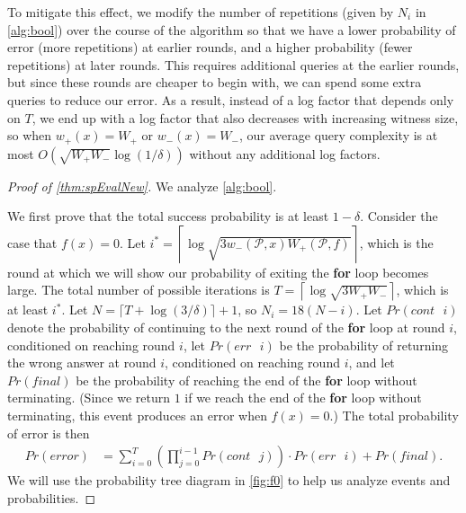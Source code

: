 \documentclass[cleveref, autoref, thm-restate,11pt]{article}
\theoremstyle{definition}
\newcommand{\sop}[1]{{\mathcal #1}}
\newcommand{\wm}[2]{{w_-({#1},{#2})}}
\newcommand{\wpo}[1]{{w_+({#1})}}
\newcommand{\wmo}[1]{{w_-({#1})}}
\newcommand{\PrCont}[1][i]{Pr(cont\textrm{ }#1)} %
\newcommand{\PrErr}[1][i]{Pr(err\textrm{ }#1)} %
\newcommand{\PrFinal}{Pr(final)} %
\newcommand{\PrTerm}[1][i]{Pr(term\textrm{ }#1)} %
\begin{document}
To mitigate this effect, we modify the number of repetitions (given by $N_i$ 
in \cref{alg:bool}) over the course 
of the algorithm so that we have a lower
probability of error (more repetitions) at earlier rounds, and a higher probability (fewer repetitions) at later
rounds. This requires additional queries
at the earlier rounds, but since these rounds are cheaper to begin with, we
can spend some extra queries to reduce our error. As a result, instead of a log factor
that depends only on $T$, we end up with a log factor that also decreases with increasing witness size, so when $\wpo{x} =
W_+$ or $\wmo{x} = W_-$, our average query complexity is at most $O\left(\sqrt
{W_+W_-}\log(1/\delta)\right)$ without any additional log factors.



\begin{proof}[Proof of \cref{thm:spEvalNew}]

We analyze \cref{alg:bool}. 

We first prove that the total success probability is at least $1 - \delta$.
Consider the case that $f(x)=0$. Let 
$i^*=\left\lceil\log\sqrt{3\wm{\sop P}{x}W_+(\sop P,f)}\right\rceil$, which is the round at which we will show our probability of exiting the \textbf{for} loop becomes large. The total number of possible iterations is $T=\left\lceil\log\sqrt{3W_+W_-}\right\rceil$, which is at least $i^*$. Let $N = \lceil T + \log(3/\delta)\rceil + 1$, so $N_i=18(N-i)$. Let $\PrCont$ denote the
probability of continuing to the next round of the \textbf{for} loop at round
$i$, conditioned on reaching round $i$,
let $\PrErr$ be the probability of returning the wrong answer at round $i$, conditioned on reaching round $i$,
and let $\PrFinal$ be the probability of reaching the end of the 
\textbf{for} loop without terminating. (Since we return $1$ if we reach the  end of
the \textbf{for} loop without terminating, this event produces an error when
$f(x)=0$.) The total probability of error is then
\begin{align}
    \label{eq:probError1} Pr(error) &= \sum_{i=0}^{T} \left(\prod_{j=0}^{i-1}\PrCont[j]\right) \cdot \PrErr + \PrFinal .
\end{align} 
We will use the probability tree diagram in \cref{fig:f0} to
 help us analyze events and probabilities. 


\end{proof}
\end{document}

